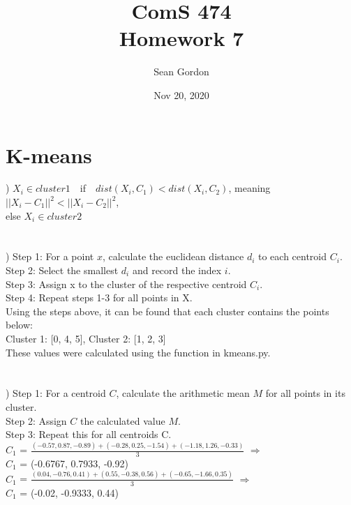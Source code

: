\documentclass[12pt]{article}
\title{ComS 474\\Homework 7}
\author{Sean Gordon}
\date{Nov 20, 2020}
\begin{document}
\maketitle


\section{K-means}


) $X_i \in cluster1$\ \ if\ \ $dist(X_i, C_1) < dist(X_i, C_2)$, meaning $||X_i - C_1||^2 < ||X_i - C_2||^2$,\\
\indent else $X_i \in cluster2$\\\\\\


) Step 1: For a point $x$, calculate the euclidean distance $d_i$ to each centroid $C_i$.\\
\indent Step 2: Select the smallest $d_i$ and record the index $i$.\\
\indent Step 3: Assign x to the cluster of the respective centroid $C_i$.\\
\indent Step 4: Repeat steps 1-3 for all points in X.\\

\indent Using the steps above, it can be found that each cluster contains the points below:\\
\indent Cluster 1: [0, 4, 5], Cluster 2: [1, 2, 3]\\

\indent These values were calculated using the  function in kmeans.py.\\\\\\


) Step 1: For a centroid $C$, calculate the arithmetic mean $M$ for all points in its cluster.\\
\indent Step 2: Assign $C$ the calculated value $M$.\\
\indent Step 3: Repeat this for all centroids C.\\

\indent $C_1$ = {\Large $\frac{(-0.57, 0.87, -0.89)+(-0.28, 0.25, -1.54)+(-1.18, 1.26, -0.33)}{3}$} $\Rightarrow$ \\
\indent $C_1$ = (-0.6767, 0.7933, -0.92)\\

\indent $C_1$ = {\Large $\frac{(0.04, -0.76, 0.41)+(0.55, -0.38, 0.56)+(-0.65, -1.66, 0.35)}{3}$} $\Rightarrow$ \\
\indent $C_1$ = (-0.02, -0.9333, 0.44)\\
\end{document}
